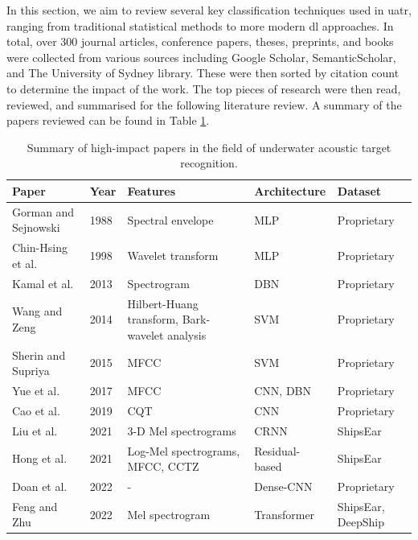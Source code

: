 In this section, we aim to review several key classification techniques used in \acrshort{uatr}, ranging from traditional statistical methods to more modern \acrlong{dl} approaches. In total, over 300 journal articles, conference papers, theses, preprints, and books were collected from various sources including Google Scholar, SemanticScholar, and The University of Sydney library. These were then sorted by citation count to determine the impact of the work. The top pieces of research were then read, reviewed, and summarised for the following literature review. A summary of the papers reviewed can be found in Table \ref{tab:classification-review-summary}.

\begin{table}
\centering
\caption{Summary of high-impact papers in the field of underwater acoustic target recognition.}
\label{tab:classification-review-summary}
\begin{tabular}{lllll}
\toprule
\textbf{Paper} & \textbf{Year} & \textbf{Features} & \textbf{Architecture} & \textbf{Dataset} \\ \midrule
Gorman and Sejnowski \cite{gorman_analysis_1988} & 1988 & Spectral envelope & MLP & Proprietary \\
Chin-Hsing et al. \cite{chin-hsing_classification_1998} & 1998 & Wavelet transform & MLP & Proprietary \\
Kamal et al. \cite{kamal_deep_2013} & 2013 & Spectrogram & DBN & Proprietary \\
Wang and Zeng \cite{wang_robust_2014} & 2014 & Hilbert-Huang transform, Bark-wavelet analysis & SVM & Proprietary \\
Sherin and Supriya \cite{sherin_b_m_selection_2015} & 2015 & MFCC & SVM & Proprietary \\
Yue et al. \cite{yue_classification_2017} & 2017 & MFCC & CNN, DBN & Proprietary \\
Cao et al. \cite{cao_convolutional_2019} & 2019 & CQT & CNN & Proprietary \\
Liu et al. \cite{liuUnderwaterTargetRecognition2021} & 2021 & 3-D Mel spectrograms & CRNN & ShipsEar \\
Hong et al. \cite{hong_underwater_2021, hongUnderwaterAcousticTarget2021a} & 2021 & Log-Mel spectrograms, MFCC, CCTZ & Residual-based & ShipsEar \\
Doan et al. \cite{doan_underwater_2022} & 2022 & - & Dense-CNN & Proprietary \\
Feng and Zhu \cite{feng_transformer-based_2022} & 2022 & Mel spectrogram & Transformer & ShipsEar, DeepShip\\ \bottomrule
\end{tabular}
\end{table}


